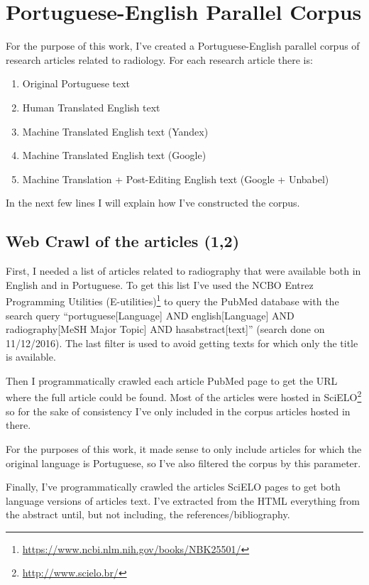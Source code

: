 \label{chap3}

\section{Portuguese-English Parallel Corpus}

For the purpose of this work, I've created a Portuguese-English parallel corpus of research articles related to radiology. For each research article there is:

\begin{enumerate}
\item Original Portuguese text
\item Human Translated English text
\item Machine Translated English text (Yandex) 
\item Machine Translated English text (Google) 
\item Machine Translation + Post-Editing English text (Google + Unbabel) 
\end{enumerate}

\noindent In the next few lines I will explain how I've constructed the corpus. 

\subsection{Web Crawl of the articles (1,2)}

First, I needed a list of articles related to radiography that were available both in English and in Portuguese. To get this list I’ve used the  NCBO Entrez Programming Utilities (E-utilities)\footnote{\url{https://www.ncbi.nlm.nih.gov/books/NBK25501/}} to query the PubMed database with the search query “portuguese[Language] AND english[Language] AND radiography[MeSH Major Topic] AND hasabstract[text]” (search done on 11/12/2016). The last filter is used to avoid getting texts for which only the title is available. 

Then I programmatically crawled each article PubMed page to get the URL where the full article could be found. Most of the articles were hosted in SciELO\footnote{\url{http://www.scielo.br/}} so for the sake of consistency I've only included in the corpus articles hosted in there. 

For the purposes of this work, it made sense to only include articles for which the original language is Portuguese, so I've also filtered the corpus by this parameter. 

Finally, I've programmatically crawled the articles SciELO pages to get both language versions of articles text. I've extracted from the HTML everything from the abstract until, but not including, the references/bibliography.

